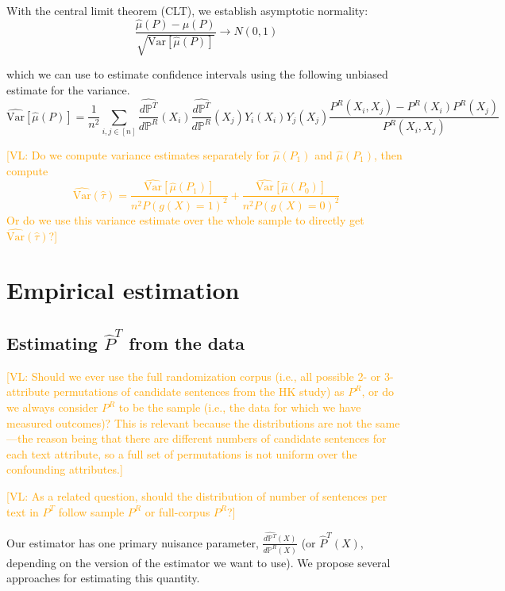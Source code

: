 \documentclass{article}
\newcommand{\vl}[1]{\textcolor{orange}{[VL: #1]}}
\begin{document}
With the central limit theorem (CLT), we establish asymptotic normality:
\begin{equation*}
    \frac{\hat{\mu}(P) - \mu(P)}{\sqrt{\text{Var}[\hat{\mu}(P)]}}\rightarrow N(0,1)
\end{equation*}

which we can use to estimate confidence intervals using the following unbiased estimate for the variance.
\begin{equation*}
    \widehat{\text{Var}}[\hat{\mu}(P)] = \frac{1}{n^2} \sum_{i,j \in [n]} \frac{\hat{d \mathbb{P}^T}}{d \mathbb{P}^R}(X_i)\frac{\hat{d \mathbb{P}^T}}{d \mathbb{P}^R}(X_j)Y_i(X_i)Y_j(X_j)\frac{P^R(X_i,X_j) - P^R(X_i)P^R(X_j)}{P^R(X_i,X_j)}
\end{equation*}

\vl{Do we compute variance estimates separately for $\hat{\mu}(P_1)$ and $\hat{\mu}(P_1)$, then compute $$\widehat{\text{Var}}(\hat{\tau})=\frac{\widehat{\text{Var}}[\hat{\mu}(P_1)]}{n^2P(g(X)=1)^2} + \frac{\widehat{\text{Var}}[\hat{\mu}(P_0)]}{n^2P(g(X)=0)^2}$$ Or do we use this variance estimate over the whole sample to directly get $\widehat{\text{Var}}(\hat{\tau})$?}

\section{Empirical estimation}
\subsection{Estimating $\hat{P}^T$ from the data}

\vl{Should we ever use the full randomization corpus (i.e., all possible 2- or 3-attribute permutations of candidate sentences from the HK study) as $P^R$, or do we always consider $P^R$ to be the sample (i.e., the data for which we have measured outcomes)? This is relevant because the distributions are not the same---the reason being that there are different numbers of candidate sentences for each text attribute, so a full set of permutations is not uniform over the confounding attributes.}

\vl{As a related question, should the distribution of number of sentences per text in $P^T$ follow sample $P^R$ or full-corpus $P^R$?}

Our estimator has one primary nuisance parameter, $\frac{\hat{d\mathbb{P}^T}(X)}{d\mathbb{P}^R(X)}$ (or $\hat{P}^T(X)$, depending on the version of the estimator we want to use). We propose several approaches for estimating this quantity.
\end{document}
